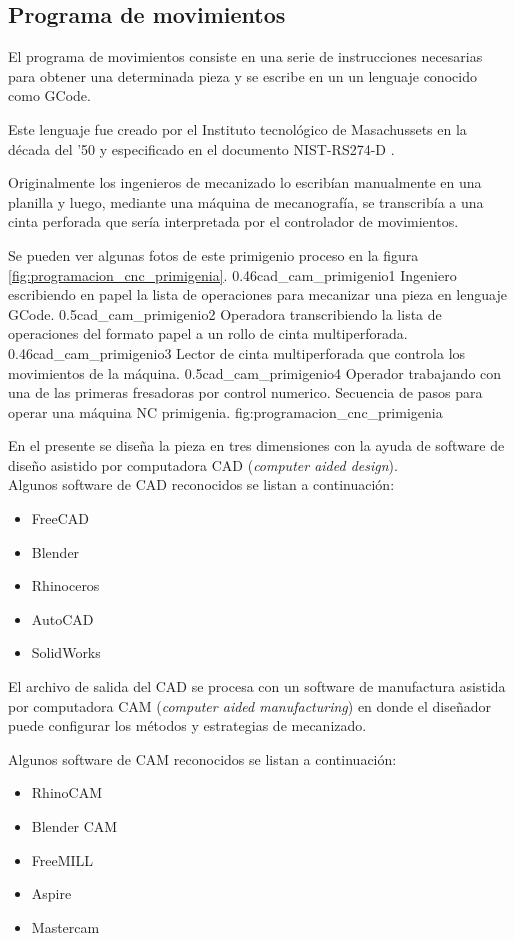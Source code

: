 \subsection{Programa de movimientos}
   El programa de movimientos consiste en una serie de instrucciones necesarias para obtener una determinada pieza y se escribe en un un lenguaje conocido como GCode\citep{WEBSITE:gcode_wiki}.\par
   Este lenguaje fue creado por el Instituto tecnológico de Masachussets en la década del '50 y especificado en el documento NIST-RS274-D \citep{rs274}.\par
Originalmente los ingenieros de mecanizado lo escribían manualmente en una planilla y luego, mediante una máquina de mecanografía, se transcribía a una cinta perforada que sería interpretada por el controlador de movimientos.\par
Se pueden ver algunas fotos de este primigenio proceso en la figura \ref{fig:programacion_cnc_primigenia}.
\subfigtwotwo
          {0.46}{cad_cam_primigenio1} {Ingeniero escribiendo en papel la lista de operaciones para mecanizar una pieza en lenguaje GCode.}
          {0.5}{cad_cam_primigenio2} {Operadora transcribiendo la lista de operaciones del formato papel a un rollo de cinta multiperforada.}
          {0.46}{cad_cam_primigenio3} {Lector de cinta multiperforada que controla los movimientos de la máquina.}
          {0.5}{cad_cam_primigenio4} {Operador trabajando con una de las primeras fresadoras por control numerico.}
          {Secuencia de pasos para operar una máquina NC primigenia.}
          {fig:programacion_cnc_primigenia}


          En el presente se diseña la pieza en tres dimensiones con la ayuda de software de diseño asistido por computadora CAD  (\textit{computer aided design}).\\
          Algunos software de CAD reconocidos se listan a continuación:
          \begin{itemize}
             \item{FreeCAD}
             \item{Blender}
             \item{Rhinoceros}
             \item{AutoCAD}
             \item{SolidWorks}
          \end{itemize}
   El archivo de salida del CAD se procesa con un software de manufactura asistida por computadora CAM (\textit{computer aided manufacturing}) en donde el diseñador puede configurar los métodos y estrategias de mecanizado.\par
          Algunos software de CAM reconocidos se listan a continuación:
          \begin{itemize}
             \item{RhinoCAM}
             \item{Blender CAM}
             \item{FreeMILL}
             \item{Aspire}
             \item{Mastercam}
          \end{itemize}

